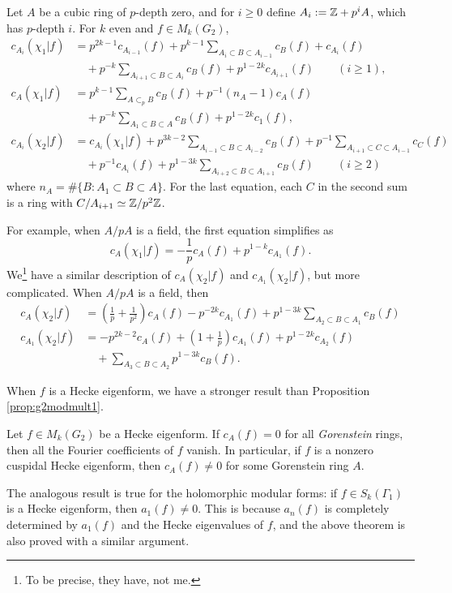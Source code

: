 \begin{proposition}
Let $A$ be a cubic ring of $p$-depth zero, and for $i \ge 0$ define  $A_i := \mathbb{Z} + p^i A$, which has $p$-depth $i$.
For $k$ even and $f \in M_k(G_2)$,
\begin{align*}
c_{A_i}(\chi_1 | f) &= p^{2k-1} c_{A_{i-1}}(f) + p^{k-1} \sum_{A_{i} \subset B \subset A_{i-1}} c_{B}(f) + c_{A_i} (f) \\
&\quad+ p^{-k} \sum_{A_{i+1} \subset B \subset A_{i}} c_{B}(f) + p^{1-2k} c_{A_{i+1}}(f) \qquad (i \ge 1),\\
c_{A}(\chi_1|f) &= p^{k-1} \sum_{A \subset_{p}B} c_B(f) + p^{-1}(n_A - 1) c_A(f) \\
&\quad+ p^{-k} \sum_{A_1 \subset B \subset A} c_B(f) + p^{1-2k} c_1(f), \\
c_{A_i}(\chi_2|f) &= c_{A_i}(\chi_1|f) + p^{3k-2} \sum_{A_{i-1} \subset B \subset A_{i-2}} c_B(f) + p^{-1} \sum_{A_{i+1} \subset C \subset A_{i-1}} c_C(f) \\
&\quad + p^{-1}c_{A_i}(f) + p^{1-3k} \sum_{A_{i+2} \subset B \subset A_{i+1}} c_B(f) \qquad (i \ge 2)
\end{align*}
where $n_A = \#\{B: A_1 \subset B \subset A\}$. For the last equation, each $C$ in the second sum is a ring with $C / A_{i+1} \simeq \mathbb{Z} / p^2 \mathbb{Z}$.
\end{proposition}
For example, when $A / pA$ is a field, the first equation simplifies as
$$
c_A(\chi_1 | f) = -\frac{1}{p} c_A(f) + p^{1-k} c_{A_1}(f).
$$
We\footnote{To be precise, they \cite{gan2002fourier} have, not me.} have a similar description of $c_{A}(\chi_2|f)$ and $c_{A_1}(\chi_2|f)$, but more complicated.
When $A / pA$ is a field, then \cite[Corollary 15.9]{gan2002fourier}
\begin{align*}
    c_A(\chi_2|f) &= \left(\frac{1}{p} + \frac{1}{p^2}\right) c_A(f) - p^{-2k} c_{A_1}(f) + p^{1-3k} \sum_{A_2 \subset B \subset A_1} c_B(f) \\
    c_{A_1}(\chi_2|f) &= -p^{2k - 2} c_{A}(f) + \left(1 + \frac{1}{p}\right) c_{A_1}(f) + p^{1-2k} c_{A_2}(f) \\
    &\quad + \sum_{A_3 \subset B \subset A_2} p^{1- 3k} c_B(f).
\end{align*}

When $f$ is a Hecke eigenform, we have a stronger result than Proposition \ref{prop:g2modmult1}.
\begin{theorem}
Let $f \in M_k(G_2)$ be a Hecke eigenform.
If $c_A(f) = 0$ for all \emph{Gorenstein} rings, then all the Fourier coefficients of $f$ vanish.
In particular, if $f$ is a nonzero cuspidal Hecke eigenform, then $c_A(f) \ne 0$ for some Gorenstein ring $A$.
\end{theorem}
The analogous result is true for the holomorphic modular forms: if $f \in S_k(\Gamma_1)$ is a Hecke eigenform, then $a_1(f) \ne 0$.
This is because $a_n(f)$ is completely determined by $a_1(f)$ and the Hecke eigenvalues of $f$, and the above theorem is also proved with a similar argument.

